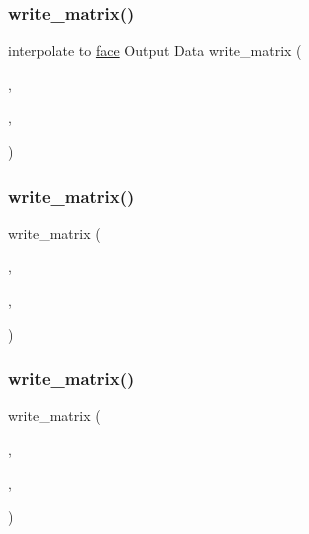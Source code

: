 \subsubsection{\texorpdfstring{write\+\_\+matrix()}{write\_matrix()}\hspace{0.1cm}{\footnotesize\ttfamily [12/15]}}
{\footnotesize\ttfamily interpolate to \hyperlink{a00611_ac4ec0037ba529da25bf084669a45f60c}{face} Output Data write\+\_\+matrix (\begin{DoxyParamCaption}\item[{\hyperlink{a00473_ae0527cbfd56392d5095a691bbf10ba5b}{f\+ID}}]{,  }\item[{\hyperlink{a00563_aa43b7c30923e8fcf939fe12082a19359}{xout}}]{,  }\item[{\textquotesingle{}\hyperlink{a00563_aa43b7c30923e8fcf939fe12082a19359}{xout}\textquotesingle{}}]{ }\end{DoxyParamCaption})}

\mbox{\label{a00473_a93bcb19dec37a557bc6b7feb115833c4}} 
\subsubsection{\texorpdfstring{write\+\_\+matrix()}{write\_matrix()}\hspace{0.1cm}{\footnotesize\ttfamily [13/15]}}
{\footnotesize\ttfamily write\+\_\+matrix (\begin{DoxyParamCaption}\item[{\hyperlink{a00473_ae0527cbfd56392d5095a691bbf10ba5b}{f\+ID}}]{,  }\item[{\hyperlink{a00563_a440aa7a05dec25dc6fe586eaa162395b}{yout}}]{,  }\item[{\textquotesingle{}\hyperlink{a00563_a440aa7a05dec25dc6fe586eaa162395b}{yout}\textquotesingle{}}]{ }\end{DoxyParamCaption})}

\mbox{\label{a00473_a9fe9cf0c49c7ea4fd2c704cd134715f4}} 
\subsubsection{\texorpdfstring{write\+\_\+matrix()}{write\_matrix()}\hspace{0.1cm}{\footnotesize\ttfamily [14/15]}}
{\footnotesize\ttfamily write\+\_\+matrix (\begin{DoxyParamCaption}\item[{\hyperlink{a00473_ae0527cbfd56392d5095a691bbf10ba5b}{f\+ID}}]{,  }\item[{Interpout}]{,  }\item[{\textquotesingle{}Interpout\textquotesingle{}}]{ }\end{DoxyParamCaption})}

